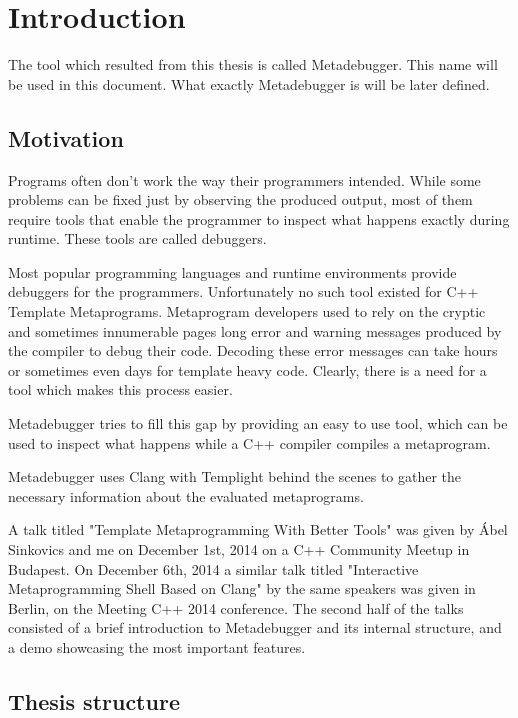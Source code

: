 
\chapter{Introduction} \label{introduction}

The tool which resulted from this thesis is called Metadebugger. This name will
be used in this document. What exactly Metadebugger is will be later defined.

\section{Motivation}

Programs often don't work the way their programmers intended. While some
problems can be fixed just by observing the produced output, most of them
require tools that enable the programmer to inspect what happens exactly
during runtime. These tools are called debuggers.

Most popular programming languages and runtime environments provide debuggers
for the programmers. Unfortunately no such tool existed for C++ Template
Metaprograms\cite{cpp14}. Metaprogram developers used to rely on the cryptic
and sometimes innumerable pages long error and warning messages produced by the
compiler to debug their code. Decoding these error messages can take hours or
sometimes even days for template heavy code\cite{sinkovics-phd,boost-spirit}.
Clearly, there is a need for a tool which makes this process easier.

Metadebugger tries to fill this gap by providing an easy to use tool, which can
be used to inspect what happens while a C++ compiler compiles a metaprogram.

Metadebugger uses Clang with Templight behind the scenes to gather the
necessary information about the evaluated metaprograms.

A talk titled "Template Metaprogramming With Better Tools" was given by Ábel
Sinkovics and me on December 1st, 2014 on a C++ Community
Meetup in Budapest\cite{cpp-meetup}. On December 6th, 2014 a similar talk
titled "Interactive Metaprogramming Shell Based on Clang" by the same speakers
was given in Berlin, on the Meeting C++ 2014 conference\cite{meeting-cpp}.
The second half of the talks consisted of a brief introduction to Metadebugger
and its internal structure, and a demo showcasing the most important features.

\section{Thesis structure}

